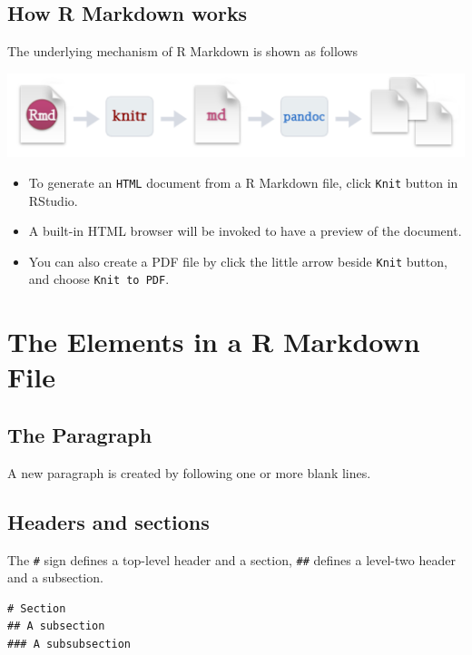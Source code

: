 \documentclass[11pt]{article}
\begin{document}
\subsection*{How R Markdown works}
\label{sec:org2940a62}

The underlying mechanism of R Markdown is shown as follows

\begin{center}
\includegraphics[width=.9\linewidth]{rmarkdown_workflow.png}
\end{center}

\begin{itemize}
\item To generate an \texttt{HTML} document from a R Markdown file, click \texttt{Knit}
button in RStudio.
\item A built-in HTML browser will be invoked to have a preview of the
document.
\item You can also create a PDF file by click the little arrow beside
\texttt{Knit} button, and choose \texttt{Knit to PDF}.
\end{itemize}

\section{The Elements in a R Markdown File}
\label{sec:org2efd88c}

\subsection*{The Paragraph}
\label{sec:org2c4b01e}

A new paragraph is created by following one or more blank lines.

\subsection*{Headers and sections}
\label{sec:orgf12af01}

The \texttt{\#} sign defines a top-level header and a section, \texttt{\#\#} defines a
level-two header and a subsection.

\begin{verbatim}
# Section
## A subsection
### A subsubsection
\end{verbatim}
\end{document}
